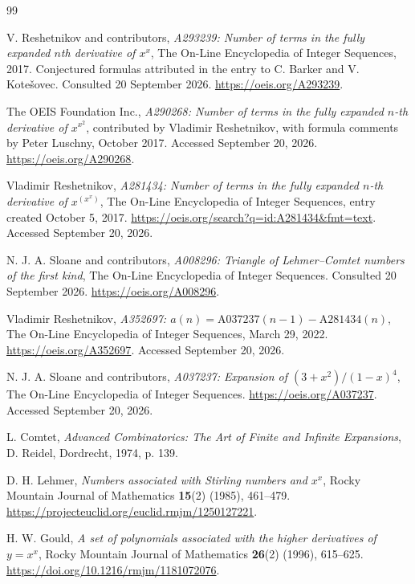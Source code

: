 \documentclass[11pt,a4paper]{article}
\numberwithin{equation}{section}
\theoremstyle{definition}
\theoremstyle{remark}
\theoremstyle{plain}
\begin{document}
\clearpage
\begin{thebibliography}{99}

V. Reshetnikov and contributors,
\emph{A293239: Number of terms in the fully expanded $n$th derivative of $x^x$},
The On-Line Encyclopedia of Integer Sequences, 2017.
Conjectured formulas attributed in the entry to C. Barker and V. Kote\v{s}ovec.
Consulted 20 September 2026.
\url{https://oeis.org/A293239}.

The OEIS Foundation Inc.,
\emph{A290268: Number of terms in the fully expanded $n$-th derivative of
$x^{x^2}$}, contributed by Vladimir Reshetnikov, with formula comments by
Peter Luschny, October 2017. Accessed September 20, 2026.
\url{https://oeis.org/A290268}.

Vladimir Reshetnikov,
\emph{A281434: Number of terms in the fully expanded $n$-th derivative of
$x^{(x^x)}$}, The On-Line Encyclopedia of Integer Sequences, entry created
October 5, 2017.
\url{https://oeis.org/search?q=id:A281434&fmt=text}.
Accessed September 20, 2026.

N. J. A. Sloane and contributors,
\emph{A008296: Triangle of Lehmer--Comtet numbers of the first kind},
The On-Line Encyclopedia of Integer Sequences.
Consulted 20 September 2026.
\url{https://oeis.org/A008296}.

Vladimir Reshetnikov,
\emph{A352697: $a(n)=\mathrm{A037237}(n-1)-\mathrm{A281434}(n)$},
The On-Line Encyclopedia of Integer Sequences, March 29, 2022.
\url{https://oeis.org/A352697}.
Accessed September 20, 2026.

N. J. A. Sloane and contributors,
\emph{A037237: Expansion of $(3+x^2)/(1-x)^4$},
The On-Line Encyclopedia of Integer Sequences.
\url{https://oeis.org/A037237}.
Accessed September 20, 2026.

L. Comtet,
\emph{Advanced Combinatorics: The Art of Finite and Infinite Expansions},
D. Reidel, Dordrecht, 1974, p. 139.

D. H. Lehmer,
\emph{Numbers associated with Stirling numbers and $x^x$},
Rocky Mountain Journal of Mathematics \textbf{15}(2) (1985), 461--479.
\url{https://projecteuclid.org/euclid.rmjm/1250127221}.

H. W. Gould,
\emph{A set of polynomials associated with the higher derivatives of $y=x^x$},
Rocky Mountain Journal of Mathematics \textbf{26}(2) (1996), 615--625.
\url{https://doi.org/10.1216/rmjm/1181072076}.


\end{thebibliography}
\end{document}
